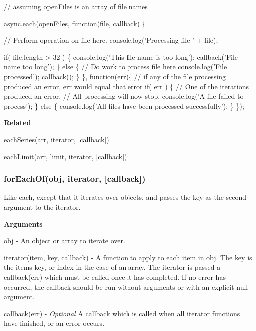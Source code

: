 \begin{DoxyCode}
// assuming openFiles is an array of file names

async.each(openFiles, function(file, callback) \{

  // Perform operation on file here.
  console.log('Processing file ' + file);

  if( file.length > 32 ) \{
    console.log('This file name is too long');
    callback('File name too long');
  \} else \{
    // Do work to process file here
    console.log('File processed');
    callback();
  \}
\}, function(err)\{
    // if any of the file processing produced an error, err would equal that error
    if( err ) \{
      // One of the iterations produced an error.
      // All processing will now stop.
      console.log('A file failed to process');
    \} else \{
      console.log('All files have been processed successfully');
    \}
\});
\end{DoxyCode}


{\bfseries Related}


\begin{DoxyItemize}
\item each\+Series(arr, iterator, \mbox{[}callback\mbox{]})
\item each\+Limit(arr, limit, iterator, \mbox{[}callback\mbox{]}) 


\end{DoxyItemize}

\label{_forEachOf}%
 \label{_eachOf}%


\subsubsection*{for\+Each\+Of(obj, iterator, \mbox{[}callback\mbox{]})}

Like {\ttfamily each}, except that it iterates over objects, and passes the key as the second argument to the iterator.

{\bfseries Arguments}


\begin{DoxyItemize}
\item {\ttfamily obj} -\/ An object or array to iterate over.
\item {\ttfamily iterator(item, key, callback)} -\/ A function to apply to each item in {\ttfamily obj}. The {\ttfamily key} is the item\textquotesingle{}s key, or index in the case of an array. The iterator is passed a {\ttfamily callback(err)} which must be called once it has completed. If no error has occurred, the callback should be run without arguments or with an explicit {\ttfamily null} argument.
\item {\ttfamily callback(err)} -\/ {\itshape Optional} A callback which is called when all {\ttfamily iterator} functions have finished, or an error occurs.
\end{DoxyItemize}

